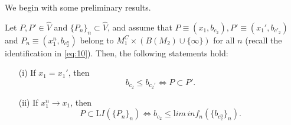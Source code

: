   We begin with some preliminary results.
  \begin{lemma}\label{lemma:aux5}
    Let $P,P'\in \hat{V}$ and $\{P_n\}_n\subset \hat{V}$, and assume that $P\equiv (x_1,b_{c_2}), P'\equiv (x_1',b_{c'_2})$ and $P_n\equiv (x_1^n,b_{c_2^n})$ belong to $M_1^C\times \left(B(M_2)\cup \{\infty\}\right)$ for all $n$ (recall the identification in \eqref{eq:10}). Then, the following statements hold:
    \begin{itemize}
    \item[(i)] If $x_1=x_1'$, then
        \[
b_{c_2}\leq b_{c_2'} \iff P\subset P'.
        \]
    \item[(ii)] If $x_1^n\rightarrow x_1$, then
      \[
P\subset {\mathrm LI}(\{P_n\}_n) \iff b_{c_2}\leq {\mathrm lim\, inf}_n (\{b_{c_2^n}\}_n).
        \]
    \end{itemize}
  \end{lemma}
